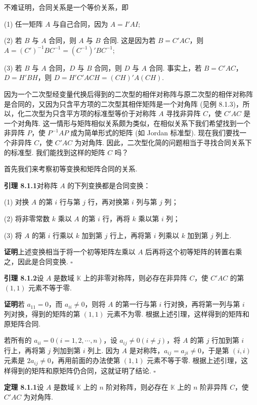 \documentclass[UTF8,12pt,a4paper,fontset=fandol]{ctexart}
\begin{document}
不难证明，合同关系是一个等价关系，即

(1) 任一矩阵 $A$ 与自己合同，因为 $A=I'A I$;

(2) 若 $B$ 与 $A$ 合同，则 $A$ 与 $B$ 合同. 这是因为若 $B=C'AC$，则 $A=(C')^{-1}BC^{-1}=(C^{-1})'BC^{-1}$;

(3) 若 $B$ 与 $A$ 合同，$D$ 与 $B$ 合同，则 $D$ 与 $A$ 合同. 事实上，若 $B=C'AC$，$D=H'BH$，则 $D=H'C'ACH=(CH)'A(CH)$.

因为一个二次型经变量代换后得到的二次型的相伴对称阵与原二次型的相伴对称阵是合同的，又因为只含平方项的二次型其相伴矩阵是一个对角阵 (见例 8.1.3)，所以，化二次型为只含平方项的标准型等价于对称阵 $A$ 寻找非异阵 $C$，使 $C'AC$ 是一个对角阵. 这一情形与矩阵相似关系颇为类似，在相似关系下我们希望找到一个非异阵 $P$，使 $P^{-1}AP$ 成为简单形式的矩阵 (如 Jordan 标准型). 现在我们要找一个非异阵 $C$，使 $C'AC$ 为对角阵. 因此，二次型化简的问题相当于寻找合同关系下的标准型. 我们能找到这样的矩阵 $C$ 吗？

首先我们来考察初等变换和矩阵合同的关系.

\noindent\textbf{引理 8.1.1}\quad 对称阵 $A$ 的下列变换都是合同变换：

(1) 对换 $A$ 的第 $i$ 行与第 $j$ 行，再对换第 $i$ 列与第 $j$ 列；

(2) 将非零常数 $k$ 乘以 $A$ 的第 $i$ 行，再将 $k$ 乘以第 $i$ 列；

(3) 将 $A$ 的第 $i$ 行乘以 $k$ 加到第 $j$ 行上，再将第 $i$ 列乘以 $k$ 加到第 $j$ 列上.

\noindent\textbf{证明}\quad 上述变换相当于将一个初等矩阵左乘以 $A$ 后再将这个初等矩阵的转置右乘之，因此是合同变换. $\square$

\noindent\textbf{引理 8.1.2}\quad 设 $A$ 是数域 $\mathbb K$ 上的非零对称阵，则必存在非异阵 $C$，使 $C'AC$ 的第 $(1,1)$ 元素不等于零.

\noindent\textbf{证明}\quad 若 $a_{11}=0$，而 $a_{ii}\neq0$，则将 $A$ 的第一行与第 $i$ 行对换，再将第一列与第 $i$ 列对换，得到的矩阵的第 $(1,1)$ 元素不为零. 根据上述引理，这样得到的矩阵和原矩阵合同.

若所有的 $a_{ii}=0(i=1,2,\cdots,n)$，设 $a_{ij}\neq0(i\neq j)$，将 $A$ 的第 $j$ 行加到第 $i$ 行上，再将第 $j$ 列加到第 $i$ 列上. 因为 $A$ 是对称阵，$a_{ij}=a_{ji}\neq0$，于是第 $(i,i)$ 元素是 $2a_{ij}\neq0$，再用前面的办法使第 $(1,1)$ 元素不等于零. 根据上述引理，这样得到的矩阵和原矩阵仍合同，这就证明了结论. $\square$

\noindent\textbf{定理 8.1.1}\quad 设 $A$ 是数域 $\mathbb K$ 上的 $n$ 阶对称阵，则必存在 $\mathbb K$ 上的 $n$ 阶非异阵 $C$，使 $C'AC$ 为对角阵.
\end{document}
